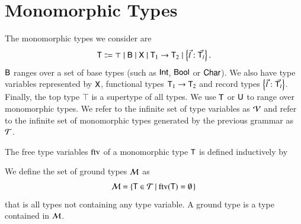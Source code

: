 \documentclass{report}
\begin{document}
  \section{Monomorphic Types}
  The monomorphic types we consider are
  \begin{displaymath}
    \textsf{T} \Coloneqq \top
             \mid \textsf{B}
             \mid \textsf{X}
             \mid \textsf{T}_1\rightarrow\textsf{T}_2
             \mid \left\{\vec{l} : \vec{\textsf{T}_l}\right\}\textrm{.}
  \end{displaymath}
  $\textsf{B}$ ranges over a set of base types (such as $\textsf{Int}$, $\textsf{Bool}$
  or $\textsf{Char}$). We also have type variables represented by $\textsf{X}$, functional
  types $\textsf{T}_1\rightarrow\textsf{T}_2$ and record types $\left\{\vec{l} : \vec{\textsf{T}_l}\right\}$.
  Finally, the top type $\top$ is a supertype of all types.
  We use $\textsf{T}$ or $\textsf{U}$ to range over monomorphic types.
  We refer to the infinite set of type variables as $\mathcal{V}$
  and refer to the infinite set of monomorphic types generated by the previous
  grammar as $\mathcal{T}$.
  \begin{dfn}
    The free type variables $\mathop{\rm ftv}\nolimits$ of a monomorphic type $\textsf{T}$
    is defined inductively by
  \end{dfn}
  \begin{dfn}
    We define the set of ground types $\mathcal{M}$ as
    \begin{displaymath}
      \mathcal{M} = \left\{{\textsf{T}\in\mathcal{T}}\left|\ {\mathop{\rm ftv}\nolimits(\textsf{T})=\emptyset}\right.\right\}
    \end{displaymath}
    that is all types not containing any type variable. A ground type is a type
    contained in $\mathcal{M}$.
  \end{dfn}
  
\end{document}
